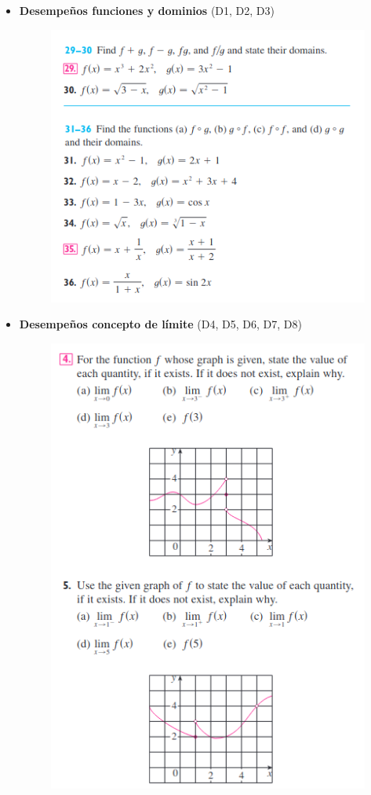 \documentclass[spanish,12pt,a4paper]{article}
\begin{document}
	\begin{itemize}
		\item \textbf{Desempeños funciones y dominios} (D1, D2, D3)
		
		\begin{figure}[h]
			\includegraphics[scale=0.9]{funciones.png}
		\end{figure}
		\newpage
		\item \textbf{Desempeños concepto de límite} (D4, D5, D6, D7, D8)
		
		\begin{figure}[h!]
			\includegraphics[scale = 0.8]{concepto_de_limite.png}\\
		\end{figure}
		

\end{itemize}
\end{document}
